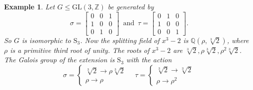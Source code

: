 \documentclass[12pt]{article}
\theoremstyle{plain}
\newtheorem{example}[theorem]{Example}
\newcommand{\Z}{\ensuremath{\mathbb{Z}}}
\newcommand{\Q}{\ensuremath{\mathbb{Q}}}
\begin{document}
\begin{example}
Let $G \leq \mathrm{GL}(3,\Z)$ be generated by $$\sigma
= \begin{bmatrix} 0 & 0 &1\\ 1 & 0 &0\\ 0 & 1 & 0
\end{bmatrix}\,\,\, \text{and} \,\,\, \tau = \begin{bmatrix}
0 & 1 &0\\
1 & 0 &0\\
0 & 0 & 1
\end{bmatrix}.$$
So $G$ is isomorphic to $\mathrm{S}_3$. 
Now the splitting field of $x^3-2$ is $\Q(\rho, \sqrt[3]{2})$, where $\rho$ is a primitive third root of unity. The roots of $x^3-2$ are $\sqrt[3]{2},\rho \sqrt[3]{2}, \rho^2 \sqrt[3]{2}$. The Galois group of the extension is $\mathrm{S}_3$ with the action $$\sigma = \begin{cases} \sqrt[3]{2}\longrightarrow \rho \sqrt[3]{2} \\ \rho \longrightarrow \rho \end{cases}\,\,\, \,\,\,\tau = \begin{cases} \sqrt[3]{2}\longrightarrow \sqrt[3]{2} \\ \rho \longrightarrow \rho^2 \end{cases}$$
%
%
%

\end{example}
\end{document}
